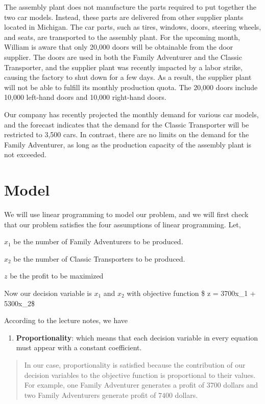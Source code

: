 \documentclass[
]{article}
\providecommand{\tightlist}{%
  \setlength{\itemsep}{0pt}\setlength{\parskip}{0pt}}
\begin{document}
The assembly plant does not manufacture the parts required to put
together the two car models. Instead, these parts are delivered from
other supplier plants located in Michigan. The car parts, such as tires,
windows, doors, steering wheels, and seats, are transported to the
assembly plant. For the upcoming month, William is aware that only
20,000 doors will be obtainable from the door supplier. The doors are
used in both the Family Adventurer and the Classic Transporter, and the
supplier plant was recently impacted by a labor strike, causing the
factory to shut down for a few days. As a result, the supplier plant
will not be able to fulfill its monthly production quota. The 20,000
doors include 10,000 left-hand doors and 10,000 right-hand doors.

Our company has recently projected the monthly demand for various car
models, and the forecast indicates that the demand for the Classic
Transporter will be restricted to 3,500 cars. In contrast, there are no
limits on the demand for the Family Adventurer, as long as the
production capacity of the assembly plant is not exceeded.

\hypertarget{model}{%
\section{Model}\label{model}}

We will use linear programming to model our problem, and we will first
check that our problem satisfies the four assumptions of linear
programming. Let,

\(x_1\) be the number of Family Adventurers to be produced.

\(x_2\) be the number of Classic Transporters to be produced.

\(z\) be the profit to be maximized

Now our decision variable is \(x_1\) and \(x_2\) with objective function
\$ z = 3700x\_1 + 5300x\_2\$

According to the lecture notes, we have

\begin{enumerate}
\def\labelenumi{\arabic{enumi}.}
\tightlist
\item
  \textbf{Proportionality}: which means that each decision variable in
  every equation must appear with a constant coefficient.
\end{enumerate}

\begin{quote}
In our case, proportionality is satisfied because the contribution of
our decision variables to the objective function is proportional to
their values. For example, one Family Adventurer generates a profit of
\(3700\) dollars and two Family Adventurers generate profit of \(7400\)
dollars.
\end{quote}
\end{document}
